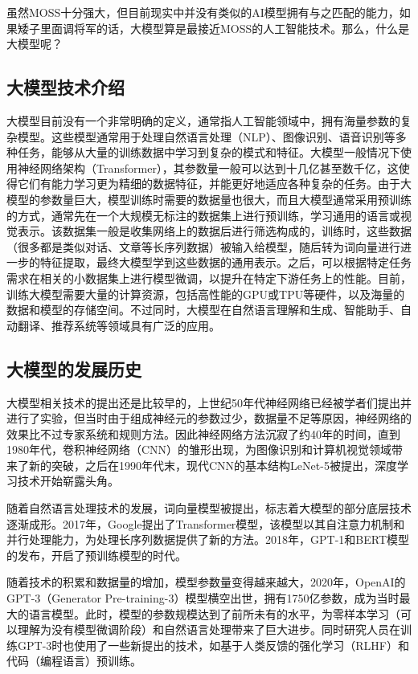 虽然MOSS十分强大，但目前现实中并没有类似的AI模型拥有与之匹配的能力，如果矮子里面调将军的话，大模型算是最接近MOSS的人工智能技术。那么，什么是大模型呢？

\subsection{大模型技术介绍}

大模型目前没有一个非常明确的定义，通常指人工智能领域中，拥有海量参数的复杂模型。这些模型通常用于处理自然语言处理（NLP）、图像识别、语音识别等多种任务，能够从大量的训练数据中学习到复杂的模式和特征。大模型一般情况下使用神经网络架构（Transformer），其参数量一般可以达到十几亿甚至数千亿，这使得它们有能力学习更为精细的数据特征，并能更好地适应各种复杂的任务。由于大模型的参数量巨大，模型训练时需要的数据量也很大，而且大模型通常采用预训练的方式，通常先在一个大规模无标注的数据集上进行预训练，学习通用的语言或视觉表示。该数据集一般是收集网络上的数据后进行筛选构成的，训练时，这些数据（很多都是类似对话、文章等长序列数据）被输入给模型，随后转为词向量进行进一步的特征提取，最终大模型学到这些数据的通用表示。之后，可以根据特定任务需求在相关的小数据集上进行模型微调，以提升在特定下游任务上的性能。目前，训练大模型需要大量的计算资源，包括高性能的GPU或TPU等硬件，以及海量的数据和模型的存储空间。不过同时，大模型在自然语言理解和生成、智能助手、自动翻译、推荐系统等领域具有广泛的应用。

\subsection{大模型的发展历史}
大模型相关技术的提出还是比较早的，上世纪50年代神经网络已经被学者们提出并进行了实验，但当时由于组成神经元的参数过少，数据量不足等原因，神经网络的效果比不过专家系统和规则方法。因此神经网络方法沉寂了约40年的时间，直到1980年代，卷积神经网络（CNN）的雏形出现，为图像识别和计算机视觉领域带来了新的突破，之后在1990年代末，现代CNN的基本结构LeNet-5被提出，深度学习技术开始崭露头角。

随着自然语言处理技术的发展，词向量模型被提出，标志着大模型的部分底层技术逐渐成形。2017年，Google提出了Transformer模型，该模型以其自注意力机制和并行处理能力，为处理长序列数据提供了新的方法。2018年，GPT-1和BERT模型的发布，开启了预训练模型的时代。

随着技术的积累和数据量的增加，模型参数量变得越来越大，2020年，OpenAI的GPT-3（Generator Pre-training-3）模型横空出世，拥有1750亿参数，成为当时最大的语言模型。此时，模型的参数规模达到了前所未有的水平，为零样本学习（可以理解为没有模型微调阶段）和自然语言处理带来了巨大进步。同时研究人员在训练GPT-3时也使用了一些新提出的技术，如基于人类反馈的强化学习（RLHF）和代码（编程语言）预训练。

